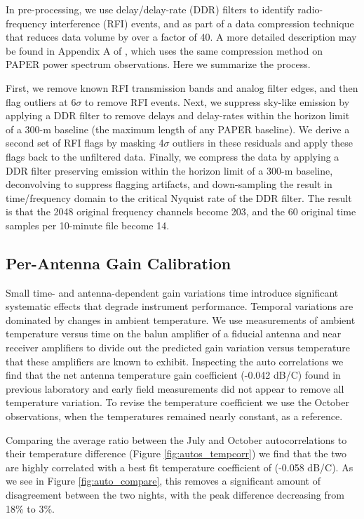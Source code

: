 \documentclass[preprint]{aastex}
\begin{document}
In pre-processing, we use delay/delay-rate (DDR) filters
\citep{Parsons:2009p7859} to identify radio-frequency interference (RFI)
events, and as part of a data compression technique that reduces data volume by
over a factor of 40.  A more detailed description may be found in Appendix A of
\cite{Parsons:2013p9876}, which uses the same compression method on PAPER power
spectrum observations. Here we summarize the process.

First, we remove known RFI transmission bands and analog filter edges, and then
flag outliers at 6$\sigma$ to remove RFI events.  Next, we suppress sky-like
emission by applying a DDR filter to remove delays and delay-rates within the
horizon limit of a 300-m baseline (the maximum length of any PAPER baseline).
We derive a second set of RFI flags by masking 4$\sigma$ outliers in these
residuals and apply these flags back to the unfiltered data.  Finally, we
compress the data by applying a DDR filter preserving emission within the
horizon limit of a 300-m baseline, deconvolving to suppress flagging artifacts,
and down-sampling the result in time/frequency domain to the critical Nyquist
rate of the DDR filter.  The result is that the 2048 original frequency
channels become 203, and the 60 original time samples per 10-minute file become
14. 


\subsection{Per-Antenna Gain Calibration}


Small time- and antenna-dependent gain variations time introduce significant systematic effects that degrade 
instrument performance. Temporal variations are dominated by changes in ambient temperature. 
We use measurements of ambient temperature versus time on the balun amplifier of a fiducial antenna and near
receiver amplifiers to divide out the predicted gain variation versus temperature that these amplifiers
are known to exhibit.  Inspecting the auto correlations we find that the net antenna temperature gain coefficient (-0.042 dB/C) found in previous laboratory \citep{Parashare:2011p9872} and early field 
measurements  \citep{Pober:2012p8800} did not appear to remove all temperature variation.  To
revise the temperature coefficient we use the October observations, when the temperatures remained nearly constant, as a reference.


Comparing the average ratio between the July and October autocorrelations to their temperature difference (Figure \ref{fig:autos_tempcorr}) we find that the two are highly correlated  with 
a best fit temperature coefficient of (-0.058 dB/C). As we see in Figure \ref{fig:auto_compare}, this removes a significant amount of disagreement between the two nights, 
with the peak difference decreasing from 18\% to 3\%.
\end{document}
